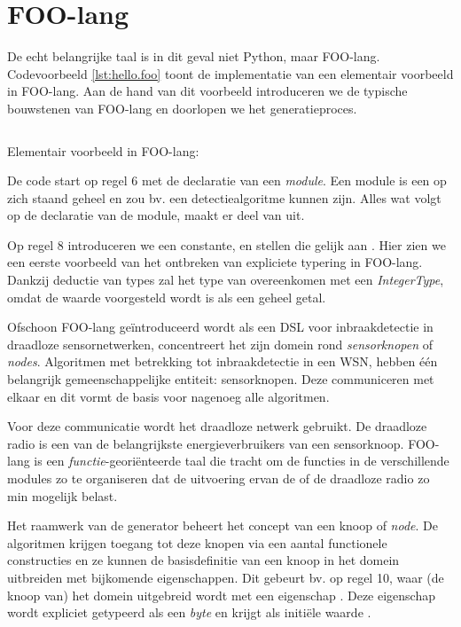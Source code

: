 
\section{FOO-lang}
\label{section:devel-foo-lang}

De echt belangrijke taal is in dit geval niet Python, maar FOO-lang.
Codevoorbeeld \ref{lst:hello.foo} toont de implementatie van een elementair
voorbeeld in FOO-lang. Aan de hand van dit voorbeeld introduceren we de
typische bouwstenen van FOO-lang en doorlopen we het generatieproces.

\begin{listing}[ht]
  \inputminted[linenos,frame=lines,framesep=2mm,fontsize=\footnotesize]{js}{../src/foo-lang/examples/hello.foo}
  \vspace{-3mm}
  \caption{Elementair voorbeeld in FOO-lang: }
  \label{lst:hello.foo}
\end{listing}

De code start op regel 6 met de declaratie van een \emph{module}. Een module is
een op zich staand geheel en zou bv. een detectiealgoritme kunnen zijn. Alles
wat volgt op de declaratie van de module, maakt er deel van uit.

Op regel 8 introduceren we een constante,  en stellen die gelijk
aan . Hier zien we een eerste voorbeeld van het ontbreken van
expliciete typering in FOO-lang. Dankzij deductie van types zal het type van
 overeenkomen met een \emph{IntegerType}, omdat de waarde
 voorgesteld wordt is als een geheel getal.

Ofschoon FOO-lang ge\"introduceerd wordt als een DSL voor inbraakdetectie in
draadloze sensornetwerken, concentreert het zijn domein rond
\emph{sensorknopen} of \emph{nodes}. Algoritmen met betrekking tot
inbraakdetectie in een WSN, hebben \'e\'en belangrijk gemeenschappelijke
entiteit: sensorknopen. Deze communiceren met elkaar en dit vormt de basis voor
nagenoeg alle algoritmen.

Voor deze communicatie wordt het draadloze netwerk gebruikt. De draadloze radio
is een van de belangrijkste energieverbruikers van een sensorknoop. FOO-lang is
een \emph{functie}-geori\"enteerde taal die tracht om de functies in de
verschillende modules zo te organiseren dat de uitvoering ervan de \mcu of de
draadloze radio zo min mogelijk belast.

Het raamwerk van de generator beheert het concept van een knoop of \emph{node}.
De algoritmen krijgen toegang tot deze knopen via een aantal functionele
constructies en ze kunnen de basisdefinitie van een knoop in het domein
uitbreiden met bijkomende eigenschappen. Dit gebeurt bv. op regel 10, waar (de
knoop van) het domein uitgebreid wordt met een eigenschap . Deze
eigenschap wordt expliciet getypeerd als een \emph{byte} en krijgt als
initi\"ele waarde .

